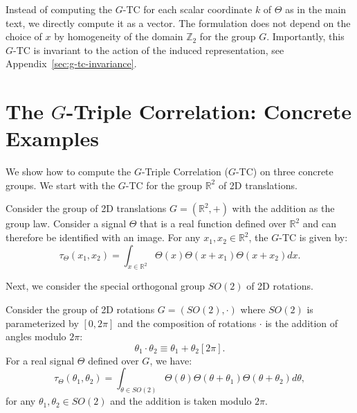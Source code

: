 Instead of computing the $G$-TC for each scalar coordinate $k$ of $\Theta$ as in the main text, we directly compute it as a vector. The formulation does not depend on the choice of $x$ by homogeneity of the domain $\mathbb{Z}_2$ for the group $G$. Importantly, this $G$-TC is invariant to the action of the induced representation, see Appendix~\ref{sec:g-tc-invariance}.




\section{The $G$-Triple Correlation: Concrete Examples}
\label{app:tc-examples}

We show how to compute the $G$-Triple Correlation ($G$-TC) on three concrete groups.
We start with the $G$-TC for the group $\mathbb{R}^2$ of 2D translations.

\begin{example}
Consider the group of 2D translations $G = (\mathbb{R}^2, +)$ with the addition as the group law. Consider a signal $\Theta$ that is a real function defined over $\mathbb{R}^2$ and can therefore be identified with an image. For any $x_1, x_2 \in \mathbb{R}^2$, the $G$-TC is given by:
\begin{equation}
    \tau_\Theta(x_1, x_2)
        = \int_{x \in \mathbb{R}^2} \Theta(x) \Theta\left(x +  x_1\right) \Theta\left(x +  x_2\right)dx.
\end{equation}
\end{example}

Next, we consider the special orthogonal group $SO(2)$ of 2D rotations.


\begin{example}
Consider the group of 2D rotations $G = (SO(2), \cdot )$ where $SO(2)$ is parameterized by $[0, 2\pi]$ and the composition of rotations $\cdot $ is the addition of angles modulo $2\pi$:
\begin{equation}
    \theta_1 \cdot \theta_2
    \equiv
    \theta_1 + \theta_2 [2\pi].
\end{equation}
For a real signal $\Theta$ defined over $G$, we have:
\begin{equation}
    \tau_\Theta(\theta_1, \theta_2)
        = \int_{\theta \in SO(2)} \Theta(\theta) \Theta\left(\theta + \theta_1\right) \Theta\left(\theta +  \theta_2\right)d\theta,
\end{equation}
    for any $\theta_1, \theta_2 \in SO(2)$ and the addition is taken modulo $2\pi$.
\end{example}

